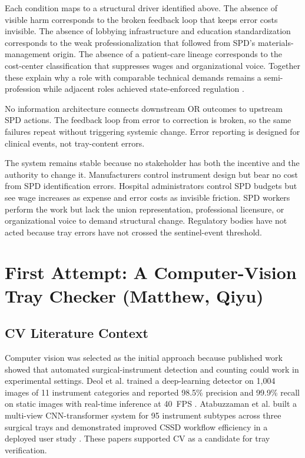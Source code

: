 \documentclass[10pt,a4paper]{article}
\begin{document}
Each condition maps to a structural driver identified above. The
absence of visible harm corresponds to the broken feedback loop that
keeps error costs invisible. The absence of lobbying infrastructure
and education standardization corresponds to the weak
professionalization that followed from SPD's materials-management
origin. The absence of a patient-care lineage corresponds to the
cost-center classification that suppresses wages and organizational
voice. Together these explain why a role with comparable technical
demands remains a semi-profession while adjacent roles achieved
state-enforced regulation \cite{etzioni-semi-professions-1969}.

No information architecture connects downstream OR outcomes to upstream SPD
actions. The feedback loop from error to correction is broken, so the same
failures repeat without triggering systemic change. Error reporting is designed
for clinical events, not tray-content errors.

The system remains stable because no stakeholder has both the incentive and the
authority to change it. Manufacturers control instrument design but bear no cost
from SPD identification errors. Hospital administrators control SPD budgets but
see wage increases as expense and error costs as invisible friction. SPD
workers perform the work but lack the union representation, professional
licensure, or organizational voice to demand structural change. Regulatory
bodies have not acted because tray errors have not crossed the sentinel-event
threshold.


\section{First Attempt: A Computer-Vision Tray Checker \hfill {\normalfont\small (Matthew, Qiyu)}}
\label{sec:first-attempt-a-computer-vision-tray-checker}
\subsection{CV Literature Context}

Computer vision was selected as the initial approach because published work
showed that automated surgical-instrument detection and counting could work in
experimental settings. Deol et al. trained a deep-learning detector on 1,004
images of 11 instrument categories and reported 98.5\% precision and 99.9\%
recall on static images with real-time inference at 40~FPS
\cite{deol-et-al-2024}. Atabuzzaman et al.
built a multi-view CNN-transformer system for 95 instrument subtypes across
three surgical trays and demonstrated improved CSSD workflow efficiency in a
deployed user study
\cite{atabuzzaman-et-al-2025}. These papers supported CV as a candidate for tray
verification.
\end{document}

